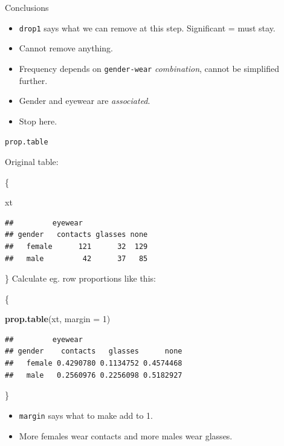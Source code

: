 \documentclass[ignorenonframetext,]{beamer}
\newenvironment{Shaded}{\begin{snugshade}}{\end{snugshade}}
\newcommand{\DataTypeTok}[1]{\textcolor[rgb]{0.13,0.29,0.53}{#1}}
\newcommand{\DecValTok}[1]{\textcolor[rgb]{0.00,0.00,0.81}{#1}}
\newcommand{\KeywordTok}[1]{\textcolor[rgb]{0.13,0.29,0.53}{\textbf{#1}}}
\newcommand{\NormalTok}[1]{#1}
\begin{document}
\begin{frame}[fragile]{Conclusions}
\protect\hypertarget{conclusions-1}{}

\begin{itemize}
\item
  \texttt{drop1} says what we can remove at this step. Significant =
  must stay.
\item
  Cannot remove anything.
\item
  Frequency depends on \texttt{gender-wear} \emph{combination}, cannot
  be simplified further.
\item
  Gender and eyewear are \emph{associated}.
\item
  Stop here.
\end{itemize}

\end{frame}

\begin{frame}[fragile]{\texttt{prop.table}}
\protect\hypertarget{prop.table}{}

Original table:

\{\footnotesize

\begin{Shaded}
\begin{Highlighting}[]
\NormalTok{xt}
\end{Highlighting}
\end{Shaded}

\begin{verbatim}
##         eyewear
## gender   contacts glasses none
##   female      121      32  129
##   male         42      37   85
\end{verbatim}

\} Calculate eg. row proportions like this:

\{\small

\begin{Shaded}
\begin{Highlighting}[]
\KeywordTok{prop.table}\NormalTok{(xt, }\DataTypeTok{margin =} \DecValTok{1}\NormalTok{)}
\end{Highlighting}
\end{Shaded}

\begin{verbatim}
##         eyewear
## gender    contacts   glasses      none
##   female 0.4290780 0.1134752 0.4574468
##   male   0.2560976 0.2256098 0.5182927
\end{verbatim}

\}

\begin{itemize}
\item
  \texttt{margin} says what to make add to 1.
\item
  More females wear contacts and more males wear glasses.
\end{itemize}

\end{frame}
\end{document}
